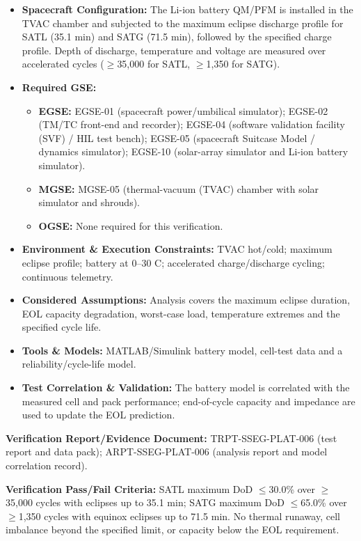\begin{itemize}
\item \textbf{Spacecraft Configuration:} The Li-ion battery QM/PFM is installed in the TVAC chamber and subjected to the maximum eclipse discharge profile for SATL (35.1 min) and SATG (71.5 min), followed by the specified charge profile. Depth of discharge, temperature and voltage are measured over accelerated cycles ($\ge$35,000 for SATL, $\ge$1,350 for SATG).
\item \textbf{Required GSE:}
\begin{itemize}
\item \textbf{EGSE:} EGSE-01 (spacecraft power/umbilical simulator); EGSE-02 (TM/TC front-end and recorder); EGSE-04 (software validation facility (SVF) / HIL test bench); EGSE-05 (spacecraft Suitcase Model / dynamics simulator); EGSE-10 (solar-array simulator and Li-ion battery simulator).
\item \textbf{MGSE:} MGSE-05 (thermal-vacuum (TVAC) chamber with solar simulator and shrouds).
\item \textbf{OGSE:} None required for this verification.
\end{itemize}
\item \textbf{Environment \& Execution Constraints:} TVAC hot/cold; maximum eclipse profile; battery at 0--30 C; accelerated charge/discharge cycling; continuous telemetry.
\item \textbf{Considered Assumptions:} Analysis covers the maximum eclipse duration, EOL capacity degradation, worst-case load, temperature extremes and the specified cycle life.
\item \textbf{Tools \& Models:} MATLAB/Simulink battery model, cell-test data and a reliability/cycle-life model.
\item \textbf{Test Correlation \& Validation:} The battery model is correlated with the measured cell and pack performance; end-of-cycle capacity and impedance are used to update the EOL prediction.
\end{itemize}
\par\textbf{Verification Report/Evidence Document:} TRPT-SSEG-PLAT-006 (test report and data pack); ARPT-SSEG-PLAT-006 (analysis report and model correlation record).
\par\textbf{Verification Pass/Fail Criteria:} SATL maximum DoD $\le$30.0\% over $\ge$35,000 cycles with eclipses up to 35.1 min; SATG maximum DoD $\le$65.0\% over $\ge$1,350 cycles with equinox eclipses up to 71.5 min. No thermal runaway, cell imbalance beyond the specified limit, or capacity below the EOL requirement.
\par\medskip
